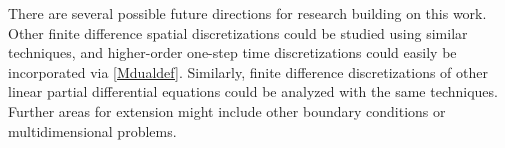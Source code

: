 \documentclass[a4paper]{article}
\begin{document}
There are several possible future directions for research building on this
work.  Other finite difference spatial discretizations could be studied
using similar techniques, and higher-order one-step time discretizations could
easily be incorporated via \eqref{Mdualdef}.  Similarly, finite difference
discretizations of other linear partial differential equations could be analyzed with the same techniques.
Further areas for extension might 
include other boundary conditions or
multidimensional problems.






\end{document}
